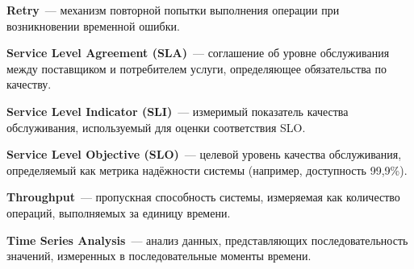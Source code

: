 \begin{sloppypar}
\textbf{Retry}~--- механизм повторной попытки выполнения операции при возникновении временной ошибки.

\textbf{Service Level Agreement (SLA)}~--- соглашение об уровне обслуживания между поставщиком и потребителем услуги, определяющее обязательства по качеству.

\textbf{Service Level Indicator (SLI)}~--- измеримый показатель качества обслуживания, используемый для оценки соответствия SLO.

\textbf{Service Level Objective (SLO)}~--- целевой уровень качества обслуживания, определяемый как метрика надёжности системы (например, доступность 99,9\%).

\textbf{Throughput}~--- пропускная способность системы, измеряемая как количество операций, выполняемых за единицу времени.

\textbf{Time Series Analysis}~--- анализ данных, представляющих последовательность значений, измеренных в последовательные моменты времени.

\end{sloppypar}

\newpage
